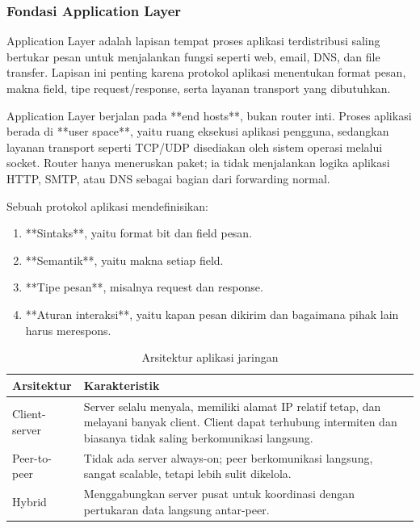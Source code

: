 \subsubsection{Fondasi Application Layer}
\begin{jawab}
Application Layer adalah lapisan tempat proses aplikasi terdistribusi saling bertukar pesan untuk menjalankan fungsi seperti web, email, DNS, dan file transfer. Lapisan ini penting karena protokol aplikasi menentukan format pesan, makna field, tipe request/response, serta layanan transport yang dibutuhkan.
\end{jawab}

Application Layer berjalan pada **end hosts**, bukan router inti. Proses aplikasi berada di **user space**, yaitu ruang eksekusi aplikasi pengguna, sedangkan layanan transport seperti TCP/UDP disediakan oleh sistem operasi melalui socket. Router hanya meneruskan paket; ia tidak menjalankan logika aplikasi HTTP, SMTP, atau DNS sebagai bagian dari forwarding normal.

Sebuah protokol aplikasi mendefinisikan:
\begin{enumerate}
    \item **Sintaks**, yaitu format bit dan field pesan.
    \item **Semantik**, yaitu makna setiap field.
    \item **Tipe pesan**, misalnya request dan response.
    \item **Aturan interaksi**, yaitu kapan pesan dikirim dan bagaimana pihak lain harus merespons.
\end{enumerate}

\begin{table}[H]
\centering
\begin{tabularx}{\textwidth}{|L{0.28\textwidth}|X|}
\hline
\textbf{Arsitektur} & \textbf{Karakteristik} \\
\hline
Client-server & Server selalu menyala, memiliki alamat IP relatif tetap, dan melayani banyak client. Client dapat terhubung intermiten dan biasanya tidak saling berkomunikasi langsung. \\
\hline
Peer-to-peer & Tidak ada server always-on; peer berkomunikasi langsung, sangat scalable, tetapi lebih sulit dikelola. \\
\hline
Hybrid & Menggabungkan server pusat untuk koordinasi dengan pertukaran data langsung antar-peer. \\
\hline
\end{tabularx}
\caption{Arsitektur aplikasi jaringan}
\label{tab:application-architecture}
\end{table}

